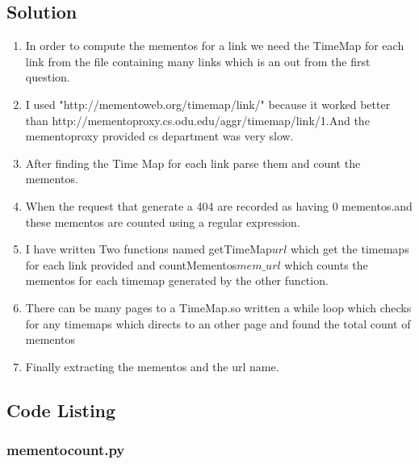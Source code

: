 \subsection{Solution}
\begin{enumerate}
\item In order to compute the mementos for a link we need the TimeMap for each link from the file containing many links which is an out from the first question.
\item I used "http://mementoweb.org/timemap/link/" because it worked better than http://mementoproxy.cs.odu.edu/aggr/timemap/link/1.And the mementoproxy provided cs department was very slow.   
\item After finding the Time Map for each link parse them and count the mementos.
\item When the request that generate a 404 are recorded as having 0 mementos.and these mementos are counted using a regular expression.
\item I have written Two functions named getTimeMap\(url\) which get the timemaps for each link provided and countMementos\(mem\_url\) which counts the mementos for each timemap generated by the other function. 
\item There can be many pages to a TimeMap.so written a while loop which checks for any timemaps which directs to an other page and found the total count of mementos

\item Finally extracting the mementos and the url name.  
  
\end{enumerate}
\newpage
\subsection{Code Listing}
\subsubsection{mementocount.py}

\newpage
